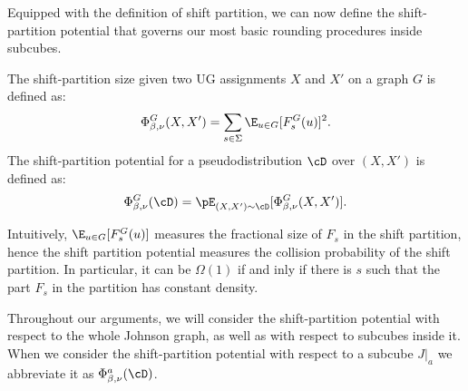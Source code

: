 
Equipped with the definition of shift partition, we can now define the shift-partition potential that governs 
our most basic rounding procedures inside 
subcubes.
\begin{definition}\label{def:shift-partition}
The shift-partition size given two UG assignments $X$ and $X'$ on a graph $G$ is defined as:
\[\Phi^G_{\beta,\nu}(X,X') = \sum_{s \in \Sigma} \E_{u \in G}[F_s^G(u)]^2.\]
The shift-partition potential for a pseudodistribution $\cD$ over $(X,X')$ is defined as:
\[\Phi^G_{\beta,\nu}(\cD) = \pE_{(X,X') \sim \cD}[\Phi^G_{\beta,\nu}(X,X')].\]
\end{definition}
Intuitively, $\E_{u \in G}[F_s^G(u)]$ measures the 
fractional size of $F_s$ in the shift partition, 
hence the shift partition potential measures the 
collision probability of the shift partition. In
particular, it can be $\Omega(1)$ if and inly if there
is $s$ such that the part $F_s$ in the partition 
has constant density.

Throughout our arguments, we will consider the shift-partition potential with respect 
to the whole Johnson graph, as well as with 
respect to subcubes inside it. When we consider the shift-partition potential with respect to a subcube $J|_a$ we abbreviate it as $\Phi^a_{\beta,\nu}(\cD)$.





